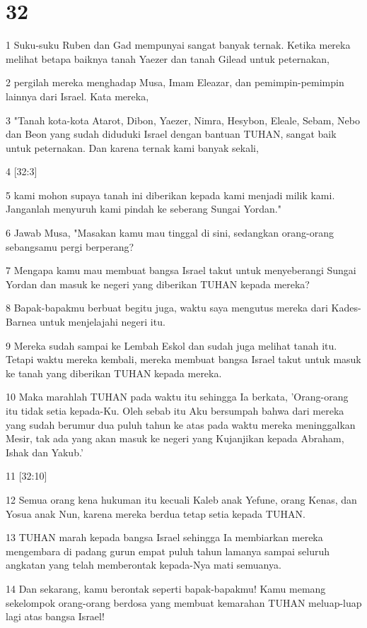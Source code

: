 \chapter{32}

\par 1 Suku-suku Ruben dan Gad mempunyai sangat banyak ternak. Ketika mereka melihat betapa baiknya tanah Yaezer dan tanah Gilead untuk peternakan,
\par 2 pergilah mereka menghadap Musa, Imam Eleazar, dan pemimpin-pemimpin lainnya dari Israel. Kata mereka,
\par 3 "Tanah kota-kota Atarot, Dibon, Yaezer, Nimra, Hesybon, Eleale, Sebam, Nebo dan Beon yang sudah diduduki Israel dengan bantuan TUHAN, sangat baik untuk peternakan. Dan karena ternak kami banyak sekali,
\par 4 [32:3]
\par 5 kami mohon supaya tanah ini diberikan kepada kami menjadi milik kami. Janganlah menyuruh kami pindah ke seberang Sungai Yordan."
\par 6 Jawab Musa, "Masakan kamu mau tinggal di sini, sedangkan orang-orang sebangsamu pergi berperang?
\par 7 Mengapa kamu mau membuat bangsa Israel takut untuk menyeberangi Sungai Yordan dan masuk ke negeri yang diberikan TUHAN kepada mereka?
\par 8 Bapak-bapakmu berbuat begitu juga, waktu saya mengutus mereka dari Kades-Barnea untuk menjelajahi negeri itu.
\par 9 Mereka sudah sampai ke Lembah Eskol dan sudah juga melihat tanah itu. Tetapi waktu mereka kembali, mereka membuat bangsa Israel takut untuk masuk ke tanah yang diberikan TUHAN kepada mereka.
\par 10 Maka marahlah TUHAN pada waktu itu sehingga Ia berkata, 'Orang-orang itu tidak setia kepada-Ku. Oleh sebab itu Aku bersumpah bahwa dari mereka yang sudah berumur dua puluh tahun ke atas pada waktu mereka meninggalkan Mesir, tak ada yang akan masuk ke negeri yang Kujanjikan kepada Abraham, Ishak dan Yakub.'
\par 11 [32:10]
\par 12 Semua orang kena hukuman itu kecuali Kaleb anak Yefune, orang Kenas, dan Yosua anak Nun, karena mereka berdua tetap setia kepada TUHAN.
\par 13 TUHAN marah kepada bangsa Israel sehingga Ia membiarkan mereka mengembara di padang gurun empat puluh tahun lamanya sampai seluruh angkatan yang telah memberontak kepada-Nya mati semuanya.
\par 14 Dan sekarang, kamu berontak seperti bapak-bapakmu! Kamu memang sekelompok orang-orang berdosa yang membuat kemarahan TUHAN meluap-luap lagi atas bangsa Israel!
